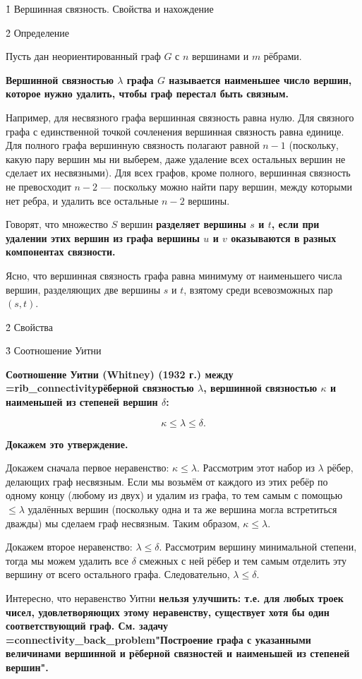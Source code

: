\h1{ Вершинная связность. Свойства и нахождение }


\h2{ Определение }

Пусть дан неориентированный граф $G$ с $n$ вершинами и $m$ рёбрами.

\bf{Вершинной связностью} $\lambda$ графа $G$ называется наименьшее число вершин, которое нужно удалить, чтобы граф перестал быть связным.

Например, для несвязного графа вершинная связность равна нулю. Для связного графа с единственной точкой сочленения вершинная связность равна единице. Для полного графа вершинную связность полагают равной $n-1$ (поскольку, какую пару вершин мы ни выберем, даже удаление всех остальных вершин не сделает их несвязными). Для всех графов, кроме полного, вершинная связность не превосходит $n-2$ --- поскольку можно найти пару вершин, между которыми нет ребра, и удалить все остальные $n-2$ вершины.

Говорят, что множество $S$ вершин \bf{разделяет} вершины $s$ и $t$, если при удалении этих вершин из графа вершины $u$ и $v$ оказываются в разных компонентах связности.

Ясно, что вершинная связность графа равна минимуму от наименьшего числа вершин, разделяющих две вершины $s$ и $t$, взятому среди всевозможных пар $(s,t)$.


\h2{ Свойства }


\h3{ Соотношение Уитни }

\bf{Соотношение Уитни (Whitney)} (1932 г.) между \algohref=rib_connectivity{рёберной связностью} $\lambda$, вершинной связностью $\kappa$ и наименьшей из степеней вершин $\delta$:

$$ \kappa \le \lambda \le \delta. $$

\bf{Докажем} это утверждение.

Докажем сначала первое неравенство: $\kappa \le \lambda$. Рассмотрим этот набор из $\lambda$ рёбер, делающих граф несвязным. Если мы возьмём от каждого из этих ребёр по одному концу (любому из двух) и удалим из графа, то тем самым с помощью $\le \lambda$ удалённых вершин (поскольку одна и та же вершина могла встретиться дважды) мы сделаем граф несвязным. Таким образом, $\kappa \le \lambda$.

Докажем второе неравенство: $\lambda \le \delta$. Рассмотрим вершину минимальной степени, тогда мы можем удалить все $\delta$ смежных с ней рёбер и тем самым отделить эту вершину от всего остального графа. Следовательно, $\lambda \le \delta$.

Интересно, что неравенство Уитни \bf{нельзя улучшить}: т.е. для любых троек чисел, удовлетворяющих этому неравенству, существует хотя бы один соответствующий граф. См. задачу \algohref=connectivity_back_problem{"Построение графа с указанными величинами вершинной и рёберной связностей и наименьшей из степеней вершин"}.


